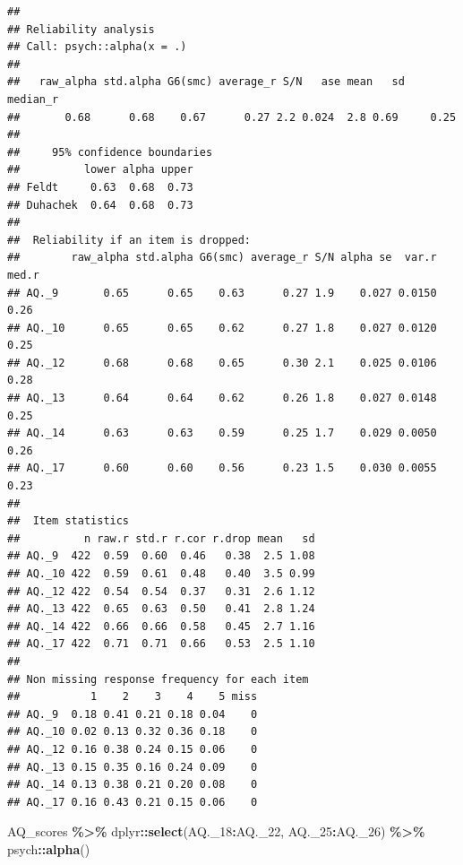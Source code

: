 \documentclass[
]{article}
\newenvironment{Shaded}{\begin{snugshade}}{\end{snugshade}}
\newcommand{\FunctionTok}[1]{\textcolor[rgb]{0.13,0.29,0.53}{\textbf{#1}}}
\newcommand{\NormalTok}[1]{#1}
\newcommand{\SpecialCharTok}[1]{\textcolor[rgb]{0.81,0.36,0.00}{\textbf{#1}}}
\begin{document}
\begin{verbatim}
## 
## Reliability analysis   
## Call: psych::alpha(x = .)
## 
##   raw_alpha std.alpha G6(smc) average_r S/N   ase mean   sd median_r
##       0.68      0.68    0.67      0.27 2.2 0.024  2.8 0.69     0.25
## 
##     95% confidence boundaries 
##          lower alpha upper
## Feldt     0.63  0.68  0.73
## Duhachek  0.64  0.68  0.73
## 
##  Reliability if an item is dropped:
##        raw_alpha std.alpha G6(smc) average_r S/N alpha se  var.r med.r
## AQ._9       0.65      0.65    0.63      0.27 1.9    0.027 0.0150  0.26
## AQ._10      0.65      0.65    0.62      0.27 1.8    0.027 0.0120  0.25
## AQ._12      0.68      0.68    0.65      0.30 2.1    0.025 0.0106  0.28
## AQ._13      0.64      0.64    0.62      0.26 1.8    0.027 0.0148  0.25
## AQ._14      0.63      0.63    0.59      0.25 1.7    0.029 0.0050  0.26
## AQ._17      0.60      0.60    0.56      0.23 1.5    0.030 0.0055  0.23
## 
##  Item statistics 
##          n raw.r std.r r.cor r.drop mean   sd
## AQ._9  422  0.59  0.60  0.46   0.38  2.5 1.08
## AQ._10 422  0.59  0.61  0.48   0.40  3.5 0.99
## AQ._12 422  0.54  0.54  0.37   0.31  2.6 1.12
## AQ._13 422  0.65  0.63  0.50   0.41  2.8 1.24
## AQ._14 422  0.66  0.66  0.58   0.45  2.7 1.16
## AQ._17 422  0.71  0.71  0.66   0.53  2.5 1.10
## 
## Non missing response frequency for each item
##           1    2    3    4    5 miss
## AQ._9  0.18 0.41 0.21 0.18 0.04    0
## AQ._10 0.02 0.13 0.32 0.36 0.18    0
## AQ._12 0.16 0.38 0.24 0.15 0.06    0
## AQ._13 0.15 0.35 0.16 0.24 0.09    0
## AQ._14 0.13 0.38 0.21 0.20 0.08    0
## AQ._17 0.16 0.43 0.21 0.15 0.06    0
\end{verbatim}

\begin{Shaded}
\begin{Highlighting}[]
\NormalTok{AQ\_scores }\SpecialCharTok{\%\textgreater{}\%}\NormalTok{ dplyr}\SpecialCharTok{::}\FunctionTok{select}\NormalTok{(AQ.\_18}\SpecialCharTok{:}\NormalTok{AQ.\_22, AQ.\_25}\SpecialCharTok{:}\NormalTok{AQ.\_26) }\SpecialCharTok{\%\textgreater{}\%}\NormalTok{ psych}\SpecialCharTok{::}\FunctionTok{alpha}\NormalTok{()}
\end{Highlighting}
\end{Shaded}
\end{document}
